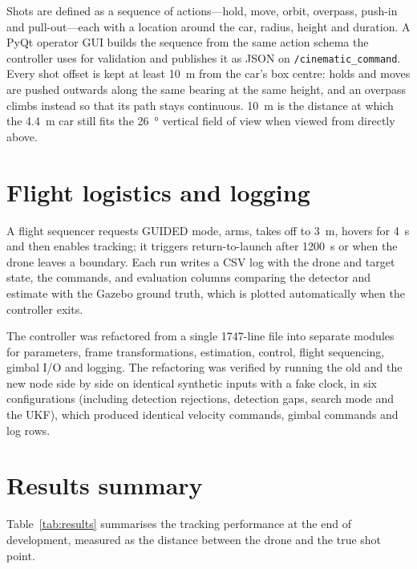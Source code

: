 \documentclass[11pt,a4paper]{report}
\begin{document}
Shots are defined as a sequence of actions---hold, move, orbit, overpass,
push-in and pull-out---each with a location around the car, radius, height and
duration. A PyQt operator GUI builds the sequence from the same action schema the
controller uses for validation and publishes it as JSON on
\texttt{/cinematic\_command}. Every shot offset is kept at least \SI{10}{m} from the
car's box centre: holds and moves are pushed outwards along the same bearing at
the same height, and an overpass climbs instead so that its path stays
continuous. \SI{10}{m} is the distance at which the \SI{4.4}{m} car still fits the
\SI{26}{\degree} vertical field of view when viewed from directly above.

\section{Flight logistics and logging}
\label{sec:logistics}

A flight sequencer requests GUIDED mode, arms, takes off to \SI{3}{m}, hovers for
\SI{4}{s} and then enables tracking; it triggers return-to-launch after
\SI{1200}{s} or when the drone leaves a boundary. Each run writes a CSV log with
the drone and target state, the commands, and evaluation columns comparing the
detector and estimate with the Gazebo ground truth, which is plotted
automatically when the controller exits.

The controller was refactored from a single \num{1747}-line file into separate
modules for parameters, frame transformations, estimation, control, flight
sequencing, gimbal I/O and logging. The refactoring was verified by running the
old and the new node side by side on identical synthetic inputs with a fake
clock, in six configurations (including detection rejections, detection gaps,
search mode and the UKF), which produced identical velocity commands, gimbal
commands and log rows.

\section{Results summary}
\label{sec:results}

Table~\ref{tab:results} summarises the tracking performance at the end of
development, measured as the distance between the drone and the true shot point.
\end{document}
